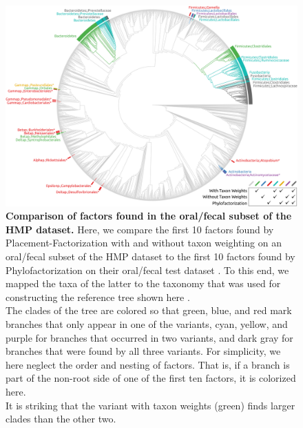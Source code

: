 \begin{figure}[!htb]
    \centering
     \includegraphics[width=\linewidth]{pdf/multi_factors_tree.pdf}
    \caption[Comparison of factors found in the oral/fecal subset of the \ac{HMP} dataset]{
        \textbf{Comparison of factors found in the oral/fecal subset of the \ac{HMP} dataset.}
        Here, we compare the first \num{10} factors found by Placement-Factorization with and without taxon weighting
        on an oral/fecal subset of the \ac{HMP} dataset
        to the first \num{10} factors found by Phylofactorization on their oral/fecal test dataset \cite{Caporaso2011,Washburne2017a}.
        To this end, we mapped the taxa of the latter to the  taxonomy \cite{Quast2013,Yilmaz2014}
        that was used for constructing the reference tree shown here \cite{Czech2018}.
        \\
        The clades of the tree are colored so that green, blue, and red mark branches that only appear in one of the variants,
        cyan, yellow, and purple for branches that occurred in two variants,
        and dark gray for branches that were found by all three variants.
        For simplicity, we here neglect the order and nesting of factors.
        That is, if a branch is part of the non-root side of one of the first ten factors, it is colorized here.
        \\
        It is striking that the variant with taxon weights (green) finds larger clades than the other two.
}
\end{figure}
